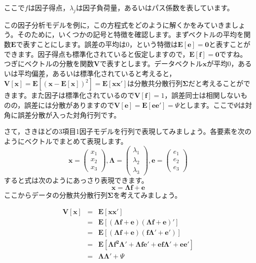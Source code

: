 \documentclass{ltjsbook}
\begin{document}
ここで$f$は因子得点，$\lambda_j$は因子負荷量，あるいはパス係数を表しています。

この因子分析モデルを例に，この方程式をどのように解くかをみていきましょう。そのために，いくつかの記号と特徴を確認します。まずベクトルの平均を関数$\bm{E}$で表すことにします。誤差の平均は0，という特徴は$\bm{E} \left[ \bm{e} \right] = \bm{0}$と表すことができます。因子得点も標準化されていると仮定しますので，$\bm{E} \left[ \bm{f}\right] = \bm{0}$ですね。つぎにベクトルの分散を関数$\bm{V}$で表すとします。データベクトル$\bm{x}$が平均0，あるいは平均偏差，あるいは標準化されていると考えると，$\bm{V} \left [ \bm{x} \right] =\bm{E} \left[ ( \bm{x} - \bm{E}\left[ \bm{x} \right] )^2 \right ] = \bm{E} \left [ \bm{xx'}\right]$は分散共分散行列$\bm{\Sigma}$だと考えることができます。また因子は標準化されているので$\bm{V}\left [ \bm{f} \right ] = 1$，誤差同士は相関しないものの，誤差には分散がありますので$\bm{V}\left[ \bm{e} \right]=\bm{E} \left[ \bm{ee'}\right] = \Psi$とします。ここで$\Psi$は対角に誤差分散が入った対角行列です。

さて，さきほどの3項目1因子モデルを行列で表現してみましょう。各要素を次のようにベクトルでまとめて表現します。
\[ \bm{x} = \begin{pmatrix} x_1\\x_2\\x_3 \end{pmatrix}, \bm{\Lambda} = \begin{pmatrix} \lambda_1\\ \lambda_2 \\ \lambda_3 \end{pmatrix}, \bm{e} = \begin{pmatrix} e_1 \\ e_2 \\ e_3 \end{pmatrix} \]
すると式は次のようにあっさり表現できます。
\[ \bm{x} = \bm{\Lambda} \bm{f} + \bm{e} \]
ここからデータの分散共分散行列$\bm{\Sigma}$を考えてみましょう。

\begin{eqnarray*}
	\bm{V}\left[ \bm{x} \right] &=& \bm{E}\left[ \bm{xx'}\right]\\
	&=& \bm{E}\left[ (\bm{\Lambda f}+\bm{e}) (\bm{\Lambda f}+\bm{e})' \right] \\
	&=& \bm{E}\left[ (\bm{\Lambda f}+\bm{e}) (\bm{f \Lambda' }+\bm{e'}) \right] \\
	&=& \bm{E}\left[ \bm{ \Lambda f^2 \Lambda' + \Lambda f e'  + ef\Lambda ' + ee' } \right] \\
	&=& \bm{\Lambda \Lambda'} + \Psi \\
\end{eqnarray*}
\end{document}
